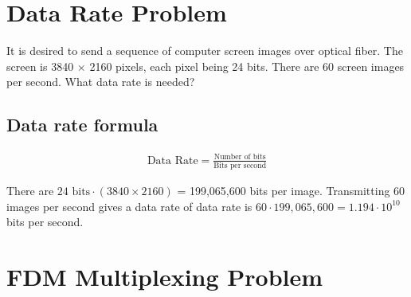 
\section{Data Rate Problem}
It is desired to send a sequence of computer screen images over optical fiber. The screen is 3840 $\times$ 2160 pixels, each pixel being 24 bits. There are 60 screen images per second. What data rate is needed?

\subsection{Data rate formula}
\begin{align*}
	\text{Data Rate} = \frac{\text{Number of bits}}{\text{Bits per second}}
\end{align*}

There are $24 \text{ bits} \cdot (3840 \times 2160)$ = 199,065,600 bits per image. Transmitting 60 images per second gives a data rate of data rate is $60 \cdot 199,065,600 = 1.194 \cdot 10^{10}$ bits per second.

\section{FDM Multiplexing Problem}
\section{}
\section{}
\section{}
\section{}
\section{}
